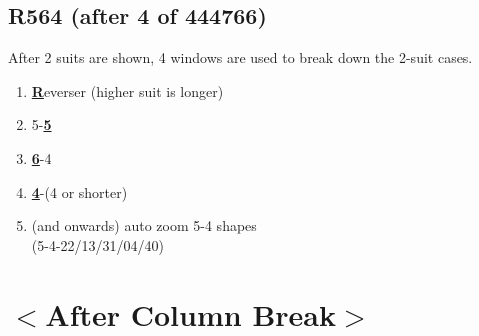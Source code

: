 \documentclass{article}
\begin{document}
\begin{multicols}{2}
\subsection{R564 (after 4 of 444766)}
After 2 suits are shown, 4 windows are used to break down the 2-suit cases.

\begin{enumerate}
    \setlength\itemsep{-0.2em}
    \item \textbf{\underline{R}}everser (higher suit is longer)
    \item 5-\textbf{\underline{5}}
    \item \textbf{\underline{6}}-4
    \item \textbf{\underline{4}}-(4 or shorter)
    \item (and onwards) auto zoom 5-4 shapes \\
        (5-4-22/13/31/04/40)
\end{enumerate}

\section{$<$After Column Break$>$}

\end{multicols}
\end{document}
